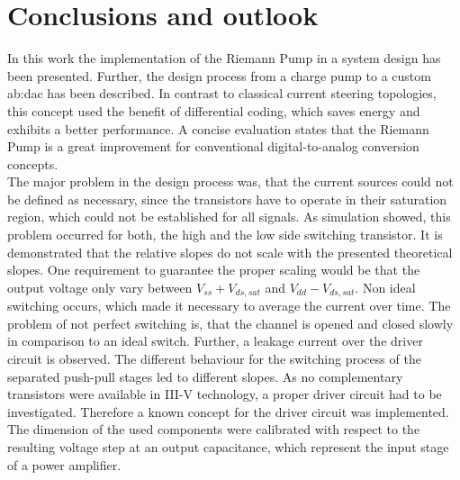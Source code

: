 \chapter{Conclusions and outlook}
In this work the implementation of the Riemann Pump in a system design has been presented.
Further, the design process from a charge pump to a custom \gls{ab:dac} has been described.
In contrast to classical current steering topologies, this concept used the benefit of differential coding, which saves energy and exhibits a better performance.
A concise evaluation states that the Riemann Pump is a great improvement for conventional digital-to-analog conversion concepts.\\
The major problem in the design process was, that the current sources could not be defined as necessary, since the transistors have to operate in their saturation region, which could not be established for all signals.
As simulation showed, this problem occurred for both, the high and the low side switching transistor.
It is demonstrated that the relative slopes do not scale with the presented theoretical slopes.
One requirement to guarantee the proper scaling would be that the output voltage only vary between $V_{ss} + V_{ds,sat}$ and $V_{dd} - V_{ds,sat}$.
Non ideal switching occurs, which made it necessary to average the current over time.
The problem of not perfect switching is, that the channel is opened and closed slowly in comparison to an ideal switch.
Further, a leakage current over the driver circuit is observed.
The different behaviour for the switching process of the separated push-pull stages led to different slopes.
As no complementary transistors were available in III-V technology, a proper driver circuit had to be investigated.
Therefore a known concept \cite{MaksimovicPaper} for the driver circuit was implemented.
The dimension of the used components were calibrated with respect to the resulting voltage step at an output capacitance, which represent the input stage of a power amplifier.
